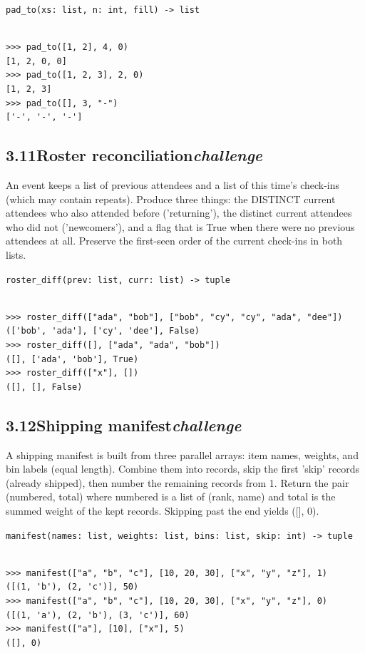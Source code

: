 \documentclass[10pt,letterpaper]{book}
\begin{document}
\noindent\texttt{pad\_to(xs: list, n: int, fill) -> list}
\begin{lstlisting}[style=ex]

>>> pad_to([1, 2], 4, 0)
[1, 2, 0, 0]
>>> pad_to([1, 2, 3], 2, 0)
[1, 2, 3]
>>> pad_to([], 3, "-")
['-', '-', '-']

\end{lstlisting}
\subsection*{3.11\quad Roster reconciliation\hfill\textnormal{\textit{challenge}}}
An event keeps a list of previous attendees and a list of this time's check-ins (which may contain repeats). Produce three things: the DISTINCT current attendees who also attended before ('returning'), the distinct current attendees who did not ('newcomers'), and a flag that is True when there were no previous attendees at all. Preserve the first-seen order of the current check-ins in both lists.

\noindent\texttt{roster\_diff(prev: list, curr: list) -> tuple}
\begin{lstlisting}[style=ex]

>>> roster_diff(["ada", "bob"], ["bob", "cy", "cy", "ada", "dee"])
(['bob', 'ada'], ['cy', 'dee'], False)
>>> roster_diff([], ["ada", "ada", "bob"])
([], ['ada', 'bob'], True)
>>> roster_diff(["x"], [])
([], [], False)

\end{lstlisting}
\subsection*{3.12\quad Shipping manifest\hfill\textnormal{\textit{challenge}}}
A shipping manifest is built from three parallel arrays: item names, weights, and bin labels (equal length). Combine them into records, skip the first 'skip' records (already shipped), then number the remaining records from 1. Return the pair (numbered, total) where numbered is a list of (rank, name) and total is the summed weight of the kept records. Skipping past the end yields ([], 0).

\noindent\texttt{manifest(names: list, weights: list, bins: list, skip: int) -> tuple}
\begin{lstlisting}[style=ex]

>>> manifest(["a", "b", "c"], [10, 20, 30], ["x", "y", "z"], 1)
([(1, 'b'), (2, 'c')], 50)
>>> manifest(["a", "b", "c"], [10, 20, 30], ["x", "y", "z"], 0)
([(1, 'a'), (2, 'b'), (3, 'c')], 60)
>>> manifest(["a"], [10], ["x"], 5)
([], 0)

\end{lstlisting}
\clearpage
\end{document}
